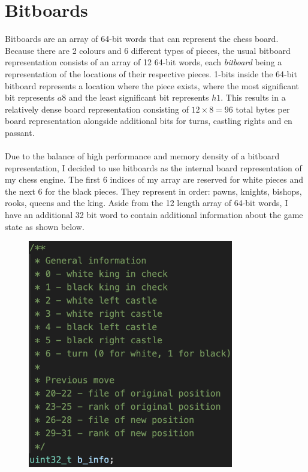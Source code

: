 \section{Bitboards}
Bitboards are an array of 64-bit words that can represent the chess board. Because there are 2 colours and 6 different types of pieces, the usual bitboard representation consists of an array of 12 64-bit words, each \textit{bitboard} being a representation of the locations of their respective pieces. 1-bits inside the 64-bit bitboard represents a location where the piece exists, where the most significant bit represents $a8$ and the least significant bit represents $h1$. This results in a relatively dense board representation consisting of $12 \times 8 = 96$ total bytes per board representation alongside additional bits for turns, castling rights and en passant.\\\\
Due to the balance of high performance and memory density of a bitboard representation, I decided to use bitboards as the internal board representation of my chess engine. The first 6 indices of my array are reserved for white pieces and the next 6 for the black pieces. They represent in order: pawns, knights, bishops, rooks, queens and the king. Aside from the 12 length array of 64-bit words, I have an additional 32 bit word to contain additional information about the game state as shown below.

\begin{figure}[ht]
    \centering
    \includegraphics[width=0.8\textwidth]{images/sc1.png}
\end{figure}